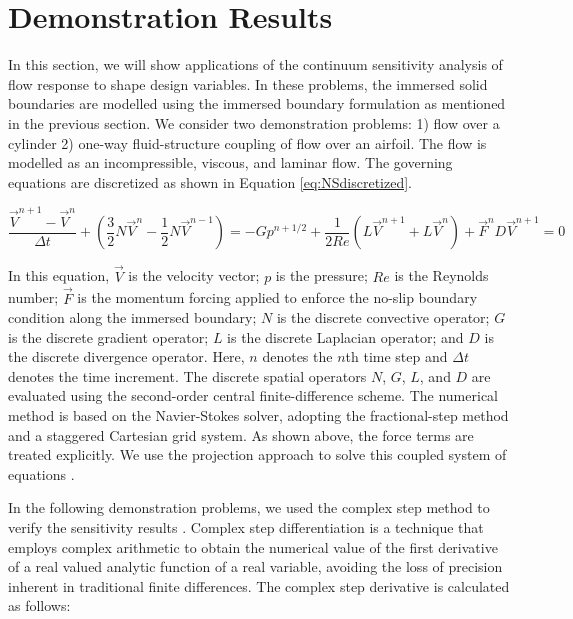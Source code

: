 \documentclass[12pt]{aiaa-pretty}
\begin{document}
\section{Demonstration Results}
In this section, we will show applications of the continuum sensitivity analysis of flow response to shape design variables. In these problems, the immersed solid boundaries are modelled using the immersed boundary formulation as mentioned in the previous section. We consider two demonstration problems: 1) flow over a cylinder 2) one-way fluid-structure coupling of flow over an airfoil. The flow is modelled as an incompressible, viscous, and laminar flow. The governing equations are discretized as shown in Equation \eqref{eq:NSdiscretized}.

%
\begin{subequations}\label{eq:NSdiscretized}
\begin{equation}
	\frac{\vec{V}^{n+1} - \vec{V}^n}{\Delta t} + 
	\left( \frac{3}{2} N\vec{V}^n - \frac{1}{2} N\vec{V}^{n-1} \right) = 
	-G p^{n + 1/2} + 
	\frac{1}{2Re} \left( L \vec{V}^{n+1} + L \vec{V}^n \right) + 
	\vec{F}^n
\end{equation}
\begin{equation}
	D \vec{V}^{n+1} = 0
\end{equation}
\end{subequations}
%

In this equation, $\vec{V}$ is the velocity vector; $p$ is the pressure; $Re$ is the Reynolds number; $\vec{F}$ is the momentum forcing applied to enforce the no-slip boundary condition along the immersed boundary; $N$ is the discrete convective operator; $G$ is the discrete gradient operator; $L$ is the discrete Laplacian operator; and $D$ is the discrete divergence operator. Here, $n$ denotes the $n$th time step and $\Delta t$ denotes the time increment. The discrete spatial operators $N$, $G$, $L$, and $D$ are evaluated using the second-order central finite-difference scheme. The numerical method is based on the Navier-Stokes solver, adopting the fractional-step method and a staggered Cartesian grid system. As shown above, the force terms are treated explicitly. We use the projection approach to solve this coupled system of equations \cite{brown2001accurate}.

In the following demonstration problems, we used the complex step method to verify the sensitivity results \cite{martins2003complex}. Complex step differentiation is a technique that employs complex arithmetic to obtain the numerical value of the first derivative of a real valued analytic function of a real variable, avoiding the loss of precision inherent in traditional finite differences. The complex step derivative is calculated as follows:
\end{document}
